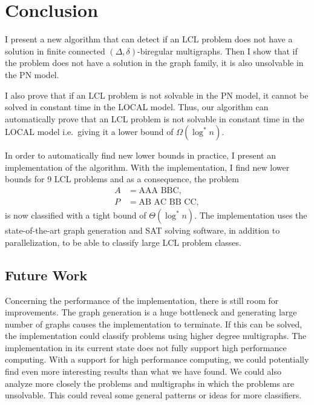 
\section{Conclusion} \label{sec:conclusion}

I present a new algorithm that can detect if an LCL problem does not have a solution in finite connected $(\Delta, \delta)$-biregular multigraphs.
Then I show that if the problem does not have a solution in the graph family, it is also unsolvable in the PN model.

I also prove that if an LCL problem is not solvable in the PN model, it cannot be solved in constant time in the LOCAL model.
Thus, our algorithm can automatically prove that an LCL problem is not solvable in constant time in the LOCAL model i.e.\ giving it a lower bound of $\Omega(\log^* n)$.

In order to automatically find new lower bounds in practice, I present an implementation of the algorithm.
With the implementation, I find new lower bounds for 9 LCL problems and as a consequence, the problem
\begin{align*}
    A&=\text{AAA BBC},\\
    P&=\text{AB AC BB CC},
\end{align*}
is now classified with a tight bound of $\Theta(\log^* n)$.
The implementation uses the state-of-the-art graph generation and SAT solving software, in addition to parallelization, to be able to classify large LCL problem classes.

\subsection{Future Work}

Concerning the performance of the implementation, there is still room for improvements.
The graph generation is a huge bottleneck and generating large number of graphs causes the implementation to terminate.
If this can be solved, the implementation could classify problems using higher degree multigraphs.
The implementation in its current state does not fully support high performance computing.
With a support for high performance computing, we could potentially find even more interesting results than what we have found.
We could also analyze more closely the problems and multigraphs in which the problems are unsolvable.
This could reveal some general patterns or ideas for more classifiers.
